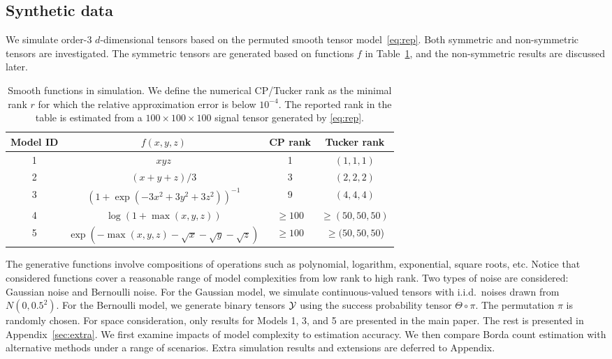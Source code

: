 \documentclass[11pt]{article}
\theoremstyle{definition}
\begin{document}
\subsection{Synthetic data}
We simulate order-3 $d$-dimensional tensors based on the permuted smooth tensor model~\eqref{eq:rep}. Both symmetric and non-symmetric tensors are investigated. The symmetric tensors are generated based on functions $f$ in Table~\ref{tb:md}, and the non-symmetric results are discussed later.
\begin{table}[htp]
    \centering
    \begin{tabular}{c|c|c|c}
        Model ID  &  $f(x,y,z)$ & CP rank & Tucker rank \\\hline
        1 &    $xyz$ & 1 & $(1,1,1)$\\
        2 &    $(x+y+z)/3$ & 3 & $(2,2,2)$\\
        3 & $(1+\exp(-3x^2+3y^2+3z^2))^{-1}$ &9& $(4,4,4)$ \\
        4 & $\log(1+\max(x,y,z))$ &$\geq 100$& $\geq (50,50,50)$ \\
        5 &  $\exp\left(-\max(x,y,z)-\sqrt{x}-\sqrt{y}-\sqrt{z}\right)$ &$\geq 100$& $\geq (50,50,50$)
    \end{tabular}
    \caption{Smooth functions in simulation. We define the numerical CP/Tucker rank as the minimal rank $r$ for which the relative approximation error is below $10^{-4}$. The reported rank in the table is estimated from a $100\times100\times100$  signal tensor generated by \eqref{eq:rep}.}
    \label{tb:md}
\end{table}
The generative functions involve compositions of operations such as polynomial, logarithm, exponential, square roots, etc. Notice that considered functions cover a reasonable range of model complexities from low rank to high rank. Two types of noise are considered: Gaussian noise and Bernoulli noise.
For the Gaussian model, we simulate continuous-valued tensors with i.i.d.\ noises drawn from $N(0,0.5^2)$. For the Bernoulli model, we generate binary tensors $\mathcal{Y}$ using the success probability tensor $\Theta \circ \pi$. The permutation $\pi$ is randomly chosen. For space consideration, only results for Models 1, 3, and 5 are presented in the main paper. The rest is presented in Appendix~\ref{sec:extra}. We first examine impacts of model complexity to estimation accuracy. We then compare Borda count estimation with alternative methods under a range of scenarios. Extra simulation results and extensions are deferred to Appendix.
\end{document}
